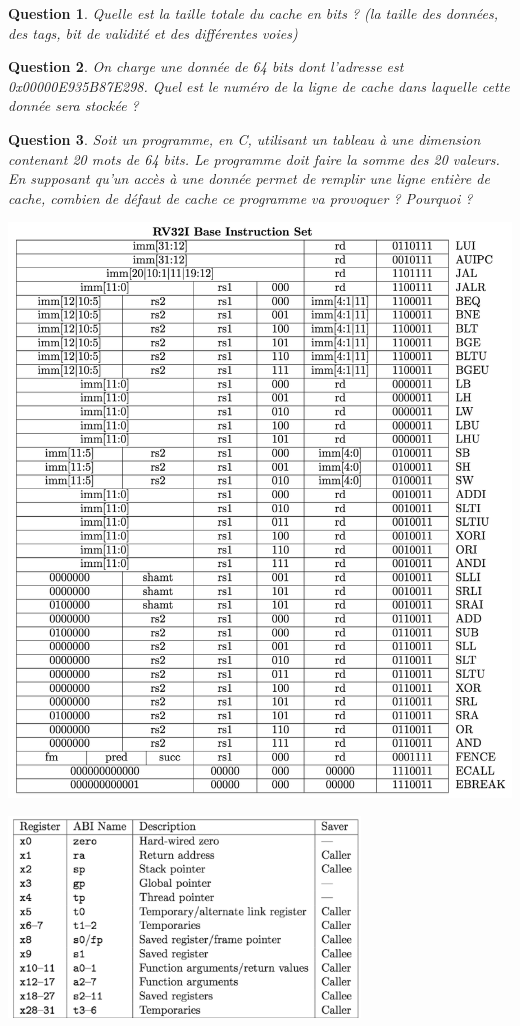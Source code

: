 \documentclass[a4paper, 11pt]{article}
\newtheorem{question}{Question}
\begin{document}
\begin{question}
Quelle est la taille totale du cache en bits ? (la taille des données, des tags, bit de validité 
et des différentes voies)
\end{question}

\begin{question}
On charge une donnée de 64 bits dont l'adresse est 0x00000E935B87E298. 
Quel est le numéro de la ligne
de cache dans laquelle cette donnée sera stockée ?
\end{question}

\begin{question}
Soit un programme, en C, utilisant un tableau à une dimension contenant 20 mots de 64 bits.
Le programme doit faire la somme des 20 valeurs. En supposant qu'un accès à une donnée permet
de remplir une ligne entière de cache, combien de défaut de cache ce programme va provoquer ?
Pourquoi ?
\end{question}

\newpage

\begin{center}
\includegraphics[width=.9\textwidth]{Codage_instructions.png}
\vspace{2ex}
\end{center}

\begin{center}
\includegraphics[width=0.7\textwidth]{registres.png}
\vspace{2ex}
\end{center}
\end{document}
